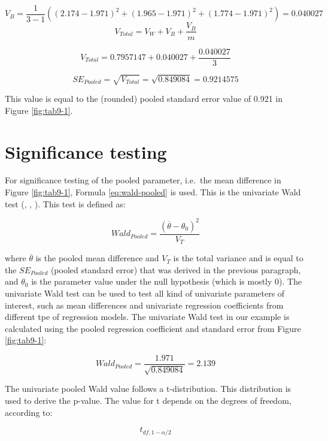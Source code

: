\documentclass[
]{book}
\begin{document}
\[V_B = \frac{1}{3-1}((2.174-1.971)^2+ (1.965-1.971)^2+(1.774-1.971)^2)=0.040027\]
\begin{equation}
V_{Total} = V_W + V_B + \frac{V_B}{m}
  \label{eq:var-t}
\end{equation}

\[V_{Total} = 0.7957147+0.040027 + \frac{0.040027}{3}\]

\[SE_{Pooled} = \sqrt{V_{Total}} = \sqrt{0.849084} = 0.9214575\]

This value is equal to the (rounded) pooled standard error value of 0.921 in Figure \ref{fig:tab9-1}.

\hypertarget{significance-testing}{%
\section{Significance testing}\label{significance-testing}}

For significance testing of the pooled parameter, i.e.~the mean difference in Figure \ref{fig:tab9-1}, Formula \eqref{eq:wald-pooled} is used. This is the univariate Wald test (\citet{Rubin1987}, \citet{VanBuuren2018}, \citet{Marshall2009MedResMeth}). This test is defined as:

\begin{equation}
Wald_{Pooled} =\frac{(\overline{\theta} - {\theta_0})^2}{V_T}
  \label{eq:wald-pooled}
\end{equation}

where \(\overline{\theta}\) is the pooled mean difference and \(V_T\) is the total variance and is equal to the \(SE_{Pooled}\) (pooled standard error) that was derived in the previous paragraph, and \(\theta_0\) is the parameter value under the null hypothesis (which is mostly 0). The univariate Wald test can be used to test all kind of univariate parameters of interest, such as mean differences and univariate regression coefficients from different tpe of regression models. The univariate Wald test in our example is calculated using the pooled regression coefficient and standard error from Figure \ref{fig:tab9-1}:

\[Wald_{Pooled} = \frac{1.971}{\sqrt{0.849084}}=2.139\]

The univariate pooled Wald value follows a t-distribution. This distribution is used to derive the p-value. The value for t depends on the degrees of freedom, according to:

\begin{equation}
t_{df,1-\alpha/2}
  \label{eq:t-distr}
\end{equation}
\end{document}
